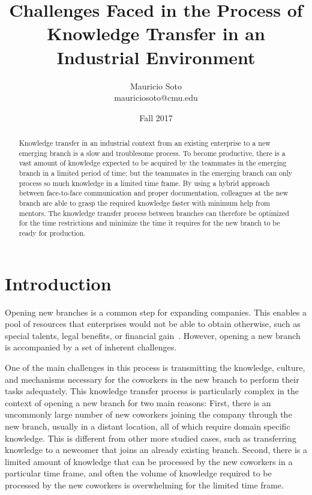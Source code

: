 \documentclass[12pt, letterpaper]{article}
\title{Challenges Faced in the Process of Knowledge Transfer in an Industrial Environment}
\author{Mauricio Soto\\
mauriciosoto@cmu.edu
}
\date{Fall 2017}
\begin{document}
 
\begin{titlepage}
\maketitle


\begin{abstract}
Knowledge transfer in an industrial context from an existing enterprise to a new emerging branch is a slow and troublesome process. To become productive, there is a vast amount of knowledge expected to be acquired by the teammates in the emerging branch in a limited period of time; but the teammates in the emerging branch can only process so much knowledge in a limited time frame. By using a hybrid
approach between face-to-face communication and proper documentation, colleagues at the new
branch are able to grasp the required knowledge faster with minimum help
from mentors. The knowledge transfer process between branches can therefore be optimized for the 
time restrictions and minimize the time it requires for the new branch to be ready for production.
\end{abstract}
\end{titlepage}
 
\section{Introduction}

Opening new branches is a common step for expanding companies. This 
enables a pool of resources that enterprises would not be able
to obtain otherwise, such as special talents, legal benefits, or financial gain~\cite{ceruttia07}.
However, 
opening a new branch is accompanied by a set of inherent challenges. 

One of the main challenges in this process is transmitting the knowledge, culture,
and mechanisms necessary for the 
coworkers in the new branch to perform their tasks adequately.
This knowledge transfer process is particularly complex in the context of opening a new branch for two main reasons: First, 
there is an uncommonly large number of new coworkers joining the company through the new branch,
usually in a distant location,
all of 
which require domain specific knowledge. This is different from other more studied cases, such 
as transferring knowledge to a newcomer that joins an already existing branch.
Second, there is a limited amount of knowledge that can be processed by the new coworkers
in a particular time frame, 
and often the volume of knowledge required to be processed by the new coworkers is overwhelming for the limited time frame.
\end{document}
